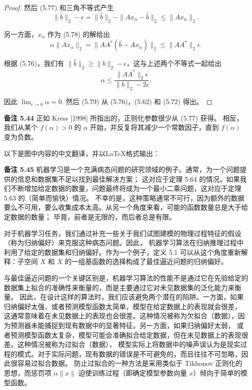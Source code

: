 \documentclass[a4paper]{ctexart}
\begin{document}
{\begin{proof}
然后 (5.77) 和三角不等式产生
\[
  \|\hat{b}\|_2 - \epsilon = \|\hat{b}\|_2 - \|A x_\alpha - \hat{b}\|_2 \leq \|A x_\alpha\|_2.
\]
  
另一方面，\(x_\alpha\) 作为 (5.78) 的解给出
\[
  \alpha \|A x_\alpha\|_2 = \|AA^*(\hat{b} - A x_\alpha)\|_2 \leq \|AA^*\|_2 \epsilon.
\]
  
根据 (5.76)，我们有 \(\|\hat{b}\|_2 \geq \|b\|_2 - \epsilon\)，这与上述两个不等式一起给出
\[
  \alpha \leq \frac{\|AA^*\|_2 \epsilon}{\|b\|_2 - 2\epsilon}.
\]
  
因此 \(\lim_{\epsilon \to 0} \alpha = 0\). 然后 (5.79) 从 (5.76)，(5.62) 和 (5.72) 得出。
\end{proof}

\noindent \textbf{备注 5.44 } 正如 Kress [1998] 所指出的，正则化参数很少从 (5.77) 获得。
相反，我们从某个 \(f(\alpha) > 0\) 的 \(\alpha\) 开始，并反复将其减少一个常数因子，直到 \(f(\alpha)\) 变为负数。

以下是图中内容的中文翻译，并以LaTeX格式输出：

\noindent \textbf{备注 5.45 } 机器学习是一个充满病态问题的研究领域的例子。通常，为一个问题提供的信息和数据集不足以找到最佳解决方案；
这对应于定理 5.64 的情况。如果我们不断增加给定数据的数量，问题最终将成为一个最小二乘问题，这对应于定理 5.63 的（简单而愉快）情况。
不幸的是，这种策略通常不可行，因为额外的数据要么不可用，要么收集成本太高。从另一个角度来看，可能的函数数量总是大于给定数据的数量；
毕竟，前者是无限的，而后者总是有限。

对于机器学习任务，我们通过补充一些关于我们试图建模的物理过程特征的假设（称为归纳偏好）来克服这种病态问题。因此，
机器学习算法在归纳推理过程中利用了给定的数据集和归纳偏好。作为一个例子，定义 5.1 可以从这个角度重新解释：子空间 \(X\) 和 \(X\) 
的一组基函数的选择构成了最佳逼近问题的归纳偏好。

与最佳逼近问题的一个关键区别是，机器学习算法的性能不是通过它在先验给定的数据集上拟合的准确性来衡量的，而是主要通过它对未见数据集的泛化能力来衡量。
因此，在设计这样的算法时，我们应该避免两个潜在的陷阱。一方面，如果归纳偏好太强，或者预测模型函数太简单，模型在给定数据上的表现就会很差，
这通常意味着在未见数据上的表现也会很差。这种情况被称为欠拟合（数据），因为预测器未能捕捉到现有数据中的显著特征。另一方面，如果归纳偏好太弱，
或者预测模型函数太复杂，模型可能会准确拟合给定数据，但在未见数据上的表现很差。这种情况被称为过拟合（数据），
模型实际上将数据中的噪声误认为是现实过程的模式。对于实际问题，现有数据的错误是不可避免的，而且往往不可忽略，因此很容易过拟合数据。
防止过拟合的一种方法是采用类似于 Tikhonov 正则化的思想，而惩罚项 \(\alpha \|x\|\) 迫使训练过程（即确定模型参数向量 \(x\)）倾向于简单的模型函数。

}
\end{document}
